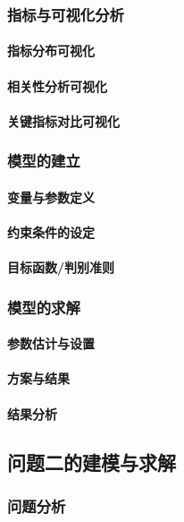 \documentclass[withoutpreface]{cumcmthesis}
\begin{document}
\subsubsection{指标与可视化分析}
\paragraph{指标分布可视化}
\paragraph{相关性分析可视化}
\paragraph{关键指标对比可视化}
\subsubsection{模型的建立}
\paragraph{变量与参数定义}
\paragraph{约束条件的设定}
\paragraph{目标函数/判别准则}
\subsubsection{模型的求解}
\paragraph{参数估计与设置}
\paragraph{方案与结果}
\paragraph{结果分析}

\subsection{问题二的建模与求解}
\subsubsection{问题分析}
\end{document}
